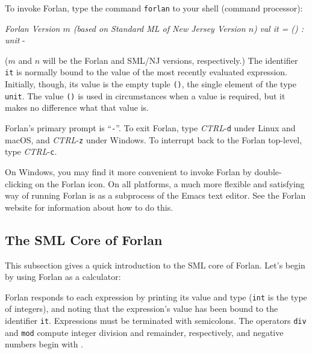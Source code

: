 To invoke Forlan, type the command \texttt{forlan} to your shell
(command processor):
\begin{myalltt}
\hspace{\leftmargini}%
\hspace{\leftmargini}\textsl{Forlan Version \(m\) (based on Standard ML of New Jersey Version \(n\))}
\hspace{\leftmargini}\textsl{val it = () : unit}
\hspace{\leftmargini}-
\end{myalltt}
($m$ and $n$ will be the Forlan and SML/NJ versions, respectively.)
The identifier \texttt{it} is normally bound to the value of the most
recently evaluated expression.
Initially, though, its value is the
empty tuple \texttt{()}, the single element of the type \texttt{unit}.
%
%
The value \texttt{()} is used in circumstances when a value is required,
but it makes no difference what that value is.

Forlan's primary prompt is ``\texttt{-}''.
%
%
To exit Forlan, type \emph{CTRL}-\texttt{d}
under Linux and macOS, and \emph{CTRL}-\texttt{z} under Windows.
To interrupt back to the Forlan top-level, type \emph{CTRL}-\texttt{c}.
%
%

On Windows, you may find it more convenient to invoke Forlan by
double-clicking on the Forlan icon.  On all platforms, a much more
flexible and satisfying way of running Forlan is as a subprocess of
the Emacs text editor.  See the Forlan website for information about
how to do this.

\subsection{The SML Core of Forlan}

This subsection gives a quick introduction to the SML core
of Forlan. Let's begin by using Forlan as a calculator:

Forlan responds to each expression by printing its value and type
(\texttt{int} is the type of integers),
%
%
%
%
and noting that the expression's value has been bound to
the identifier \texttt{it}.  Expressions must be terminated with
semicolons.
%
The operators \texttt{div} and \texttt{mod} compute integer division
and remainder, respectively, and negative numbers begin with
\texttt{\tildesym}.

